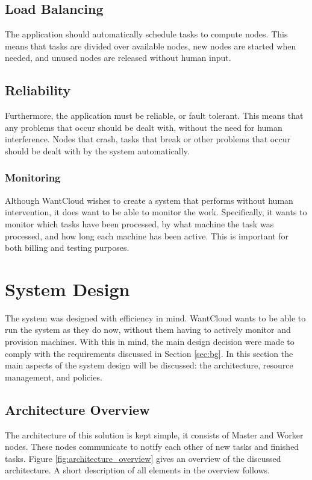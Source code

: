 \documentclass{acm_proc_article-sp}
\begin{document}
\subsection{Load Balancing}
The application should automatically schedule tasks to compute nodes.
This means that tasks are divided over available nodes, new nodes are started when needed, and unused nodes are released without human input.

\subsection{Reliability}
Furthermore, the application must be reliable, or fault tolerant.
This means that any problems that occur should be dealt with, without the need for human interference.
Nodes that crash, tasks that break or other problems that occur should be dealt with by the system automatically.

\subsubsection{Monitoring}
Although WantCloud wishes to create a system that performs without human intervention, it does want to be able to monitor the work.
Specifically, it wants to monitor which tasks have been processed, by what machine the task was processed, and how long each machine has been active.
This is important for both billing and testing purposes.

\section{System Design}
\label{sec:system}
The system was designed with efficiency in mind.
WantCloud wants to be able to run the system as they do now, without them having to actively monitor and provision machines.
With this in mind, the main design decision were made to comply with the requirements discussed in Section \ref{sec:bg}.
In this section the main aspects of the system design will be discussed: the architecture, resource management, and policies.

\subsection{Architecture Overview}
The architecture of this solution is kept simple, it consists of Master and Worker nodes.
These nodes communicate to notify each other of new tasks and finished tasks.
Figure \ref{fig:architecture_overview} gives an overview of the discussed architecture.
A short description of all elements in the overview follows.
\end{document}
